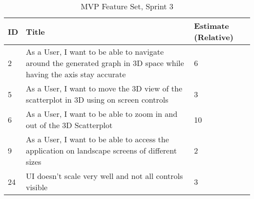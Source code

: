 \begin{table*}[h]
    \begin{tabular}{ | l | l | l | }
        \hline
        ID & Title                                                                                                               & Estimate (Relative) \\
        \hline
        2  & As a User, I want to be able to navigate around the generated graph in 3D space while having the axis stay accurate & 6                   \\
        \hline
        5  & As a User, I want to move the 3D view of the scatterplot in 3D using on screen controls                             & 3                   \\
        \hline
        6  & As a User, I want to be able to zoom in and out of the 3D Scatterplot                                               & 10                  \\
        \hline
        9  & As a User, I want to be able to access the application on landscape screens of different sizes                      & 2                   \\
        \hline
        24 & UI doesn't scale very well and not all controls visible                                                             & 3                   \\
        \hline
    \end{tabular}
    \caption{MVP Feature Set, Sprint 3}
    \label{sprint3}
\end{table*}